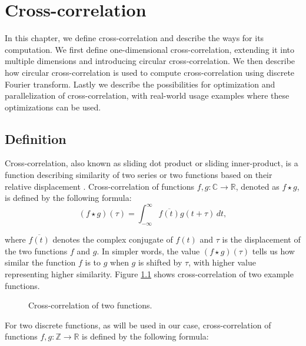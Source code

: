 
\chapter{Cross-correlation}
\label{sec:cross_corr}

In this chapter, we define cross-correlation and describe the ways for its computation. We first define one-dimensional cross-correlation, extending it into multiple dimensions and introducing circular cross-correlation. We then describe how circular cross-correlation is used to compute cross-correlation using discrete Fourier transform. Lastly we describe the possibilities for optimization and parallelization of cross-correlation, with real-world usage examples where these optimizations can be used.



\section{Definition}
\label{sec:cross_corr_def}

Cross-correlation, also known as sliding dot product or sliding inner-product, is a function describing similarity of two series or two functions based on their relative displacement \citep{site:wiki_cross_corr}.
Cross-correlation of functions $f,g: \mathbb{C} \rightarrow \mathbb{R}$, denoted as \(f \star g\), is defined by the following formula:
\[
	(f \star g)(\tau) = \int_{-\infty}^{\infty} \overline{f(t)}g(t + \tau) \,dt,
\] 

where \(\overline{f(t)}\) denotes the complex conjugate of \(f(t)\) and \(\tau\) is the displacement of the two functions \(f\) and \(g\). In simpler words, the value \((f \star g)(\tau)\) tells us how similar the function \(f\) is to \(g\) when \(g\) is shifted by \(\tau\), with higher value representing higher similarity. Figure \ref{fig:cross_corr_example} shows cross-correlation of two example functions.

\begin{figure}[h]
	\centering
	\def\svgwidth{0.8\textwidth}
	
	\caption{Cross-correlation of two functions. \cite{pic:crosscorr}}
	\label{fig:cross_corr_example}
\end{figure}

For two discrete functions, as will be used in our case, cross-correlation of functions \( f, g : \mathbb{Z} \rightarrow \mathbb{R} \) is defined by the following formula:

